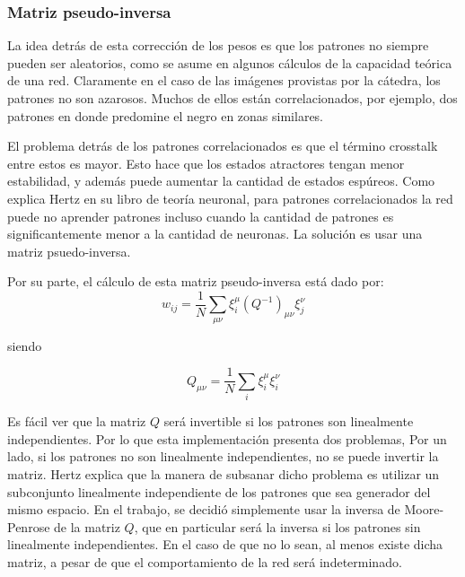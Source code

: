 \documentclass[%
    final,
    reprint,
    notitlepage,
    narroweqnarray,
    inline,
    twoside,
    invited
    ]{ieee}
\begin{document}
\subsubsection{Matriz pseudo-inversa}

\par La idea detrás de esta corrección de los pesos es que los patrones no siempre pueden ser 
aleatorios, como se asume en algunos cálculos de la capacidad teórica de una red. Claramente 
en el caso de las imágenes provistas por la cátedra, los patrones no son azarosos. Muchos de ellos 
están correlacionados, por ejemplo, dos patrones en donde predomine el negro en zonas similares. 
\par El problema detrás de los patrones correlacionados es que el término crosstalk entre estos 
es mayor. Esto hace que los estados atractores tengan menor estabilidad, y además puede aumentar 
la cantidad de estados espúreos. Como explica Hertz en su libro de teoría neuronal, para patrones 
correlacionados la red puede no aprender patrones incluso cuando la cantidad de patrones 
es significantemente menor a la cantidad de neuronas. La solución es usar una 
matriz psuedo-inversa.

\par Por su parte, el cálculo de esta matriz pseudo-inversa está dado por:\\

\begin{equation}
w_{ij}=\frac{1}{N}\sum_{\mu \nu} \xi_i^{\mu}(Q^{-1})_{\mu \nu}  \xi_j^{\nu}
\end{equation}

siendo 

\begin{equation}
Q_{\mu \nu} = \frac{1}{N}\sum_{i}  \xi_i^{\mu}  \xi_i^{\nu}
\end{equation}



\par Es fácil ver que la matriz $Q$ será invertible si los patrones son linealmente independientes. 
Por lo que esta implementación presenta dos problemas, Por un lado, si los patrones no son 
linealmente independientes, no se puede invertir la matriz. Hertz explica que la manera de subsanar 
dicho problema es utilizar un subconjunto linealmente independiente de los patrones que sea generador 
del mismo espacio. En el trabajo, se decidió simplemente usar la inversa de Moore-Penrose de la matriz $Q$, 
que en particular será la inversa si los patrones sin linealmente independientes. En el caso de que no lo sean, 
al menos existe dicha matriz, a pesar de que el comportamiento de la red será indeterminado.
\end{document}
